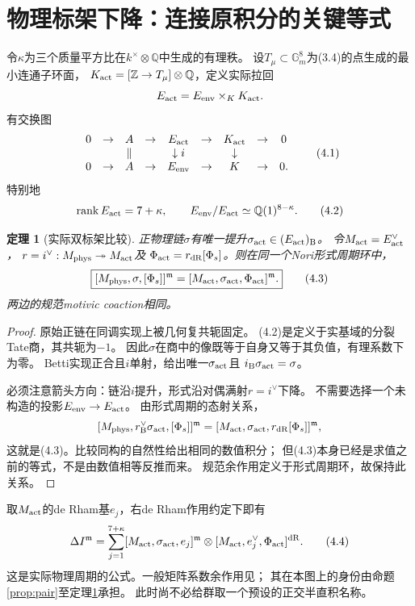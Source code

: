 \documentclass[11pt,a4paper]{ctexart}
\theoremstyle{cnplain}\newtheorem{theorem}{定理}[section]
\theoremstyle{remark}\newtheorem{remark}[theorem]{注}
\newcommand{\Q}{\mathbb Q}\newcommand{\C}{\mathbb C}\newcommand{\Z}{\mathbb Z}
\newcommand{\Gm}{\mathbb G_m}\newcommand{\PP}{\mathbb P}
\newcommand{\dR}{\mathrm{dR}}\newcommand{\B}{\mathrm B}
\newcommand{\mot}{\mathfrak m}
\begin{document}
\section{物理标架下降：连接原积分的关键等式}
令$\kappa$为三个质量平方比在$k^\times\otimes\Q$中生成的有理秩。
设$T_\mu\subset\Gm^8$为(3.4)的点生成的最小连通子环面，
$K_{\rm act}=[\Z\to T_\mu]\otimes\Q$，定义实际拉回
\[
 E_{\rm act}=E_{\rm env}\times_K K_{\rm act}.
\]
有交换图
\[
\begin{array}{ccccccccc}
0&\to&A&\to&E_{\rm act}&\to&K_{\rm act}&\to&0\\
 &&\Vert&&\downarrow i&&\downarrow&&\\
0&\to&A&\to&E_{\rm env}&\to&K&\to&0 .
\end{array}                                                     \tag{4.1}
\]
特别地
\[
 \rk E_{\rm act}=7+\kappa,\qquad
 E_{\rm env}/E_{\rm act}\simeq\Q(1)^{8-\kappa}.                   \tag{4.2}
\]

\begin{theorem}[实际双标架比较]\label{thm:frame}
正物理链$\sigma$有唯一提升$\sigma_{\rm act}\in(E_{\rm act})_\B$。
令$M_{\rm act}=E_{\rm act}^{\vee}$，
$r=i^\vee:M_{\rm phys}\twoheadrightarrow M_{\rm act}$及
$\Phi_{\rm act}=r_\dR[\Phi_s]$。则在同一个Nori形式周期环中，
\[
 \boxed{[M_{\rm phys},\sigma,[\Phi_s]]^\mot
       =[M_{\rm act},\sigma_{\rm act},\Phi_{\rm act}]^\mot.}      \tag{4.3}
\]
两边的规范motivic coaction相同。
\end{theorem}
\begin{proof}
原始正链在同调实现上被几何复共轭固定。
(4.2)是定义于实基域的分裂Tate商，其共轭为$-1$。
因此$\sigma$在商中的像既等于自身又等于其负值，有理系数下为零。
Betti实现正合且$i$单射，给出唯一$\sigma_{\rm act}$且
$i_\B\sigma_{\rm act}=\sigma$。

必须注意箭头方向：链沿$i$提升，形式沿对偶满射$r=i^\vee$下降。
不需要选择一个未构造的投影$E_{\rm env}\to E_{\rm act}$。
由形式周期的态射关系，
\[
 [M_{\rm phys},r_\B^\vee\sigma_{\rm act},[\Phi_s]]^\mot
 =[M_{\rm act},\sigma_{\rm act},r_\dR[\Phi_s]]^\mot,
\]
这就是(4.3)。比较同构的自然性给出相同的数值积分；
但(4.3)本身已经是求值之前的等式，不是由数值相等反推而来。
规范余作用定义于形式周期环，故保持此关系。
\end{proof}

取$M_{\rm act}$的de Rham基$e_j$，右de Rham作用约定下即有
\[
 \Delta I^\mot
 =\sum_{j=1}^{7+\kappa}
 [M_{\rm act},\sigma_{\rm act},e_j]^\mot
 \otimes[M_{\rm act},e_j^\vee,\Phi_{\rm act}]^\dR.                \tag{4.4}
\]
这是实际物理周期的公式。一般矩阵系数余作用见\cite[\S2.3]{Brown}；
其在本图上的身份由命题\ref{prop:pair}至定理\ref{thm:frame}承担。
此时尚不必给群取一个预设的正交半直积名称。
\end{document}
